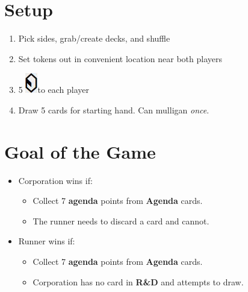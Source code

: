 \documentclass[12pt]{article}
\newenvironment{enumerateCustom}
{\begin{enumerate}
  \setlength{\itemsep}{1pt}
  \setlength{\parskip}{0pt}
  \setlength{\parsep}{0pt}}
{\end{enumerate}}
\newenvironment{itemizeCustom}
{\begin{itemize}
  \setlength{\itemsep}{1pt}
  \setlength{\parskip}{0pt}
  \setlength{\parsep}{0pt}}
{\end{itemize}}
\newcommand{\credit}{\includegraphics[scale=0.40]{images/creditLarge.jpg}\hspace{0.3em}}
\begin{document}
\renewcommand{\labelenumi}{\arabic{enumi}.}
\renewcommand{\labelenumii}{\arabic{enumi}.\arabic{enumii}.}

\begin{multicols*}{2}

\section*{Setup}
\begin{enumerateCustom}
	\item Pick sides, grab/create decks, and shuffle
	\item Set tokens out in convenient location near both players
	\item 5 \credit to each player
	\item Draw 5 cards for starting hand. Can mulligan \emph{once}.
\end{enumerateCustom}

\section*{Goal of the Game}
\begin{itemizeCustom}
	\item Corporation wins if:
		\begin{itemizeCustom}
			\item Collect 7 \textbf{agenda} points from \textbf{Agenda} cards.
			\item The runner needs to discard a card and cannot.
		\end{itemizeCustom}
	\item Runner wins if:
		\begin{itemizeCustom}
			\item Collect 7 \textbf{agenda} points from \textbf{Agenda} cards.
			\item Corporation has no card in \textbf{R\&D} and attempts to draw.
		\end{itemizeCustom}
\end{itemizeCustom}


\end{multicols*}
\end{document}
